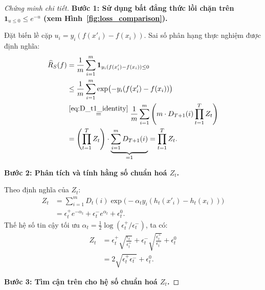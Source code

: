 \begin{proof}[Chứng minh chi tiết]
\textbf{Bước 1: Sử dụng bất đẳng thức lồi chặn trên $\mathbf{1}_{u \leq 0} \leq e^{-u}$ (xem Hình~\ref{fig:loss_comparison}).}

Đặt biến lề cặp $u_i = y_i(f(x'_i) - f(x_i))$. Sai số phân hạng thực nghiệm được định nghĩa:
\begin{align*}
    \widehat{R}_S(f) &= \frac{1}{m} \sum_{i=1}^m \mathbf{1}_{y_i(f(x'_i) - f(x_i)) \leq 0} \\
    &\leq \frac{1}{m} \sum_{i=1}^m \exp\bigl(-y_i(f(x'_i) - f(x_i))\bigr) \\
    &\stackrel{\eqref{eq:D_t1_identity}}{=} \frac{1}{m} \sum_{i=1}^m \left( m \cdot D_{T+1}(i) \prod_{t=1}^T Z_t \right) \\
    &= \left( \prod_{t=1}^T Z_t \right) \cdot \underbrace{\sum_{i=1}^m D_{T+1}(i)}_{=1} = \prod_{t=1}^T Z_t.
\end{align*}

\textbf{Bước 2: Phân tích và tính hằng số chuẩn hoá $Z_t$.}

Theo định nghĩa của $Z_t$:
\begin{align*}
    Z_t &= \sum_{i=1}^m D_t(i) \exp\bigl(-\alpha_t y_i(h_t(x'_i) - h_t(x_i))\bigr) \\
    &= \epsilon^+_t e^{-\alpha_t} + \epsilon^-_t e^{\alpha_t} + \epsilon^0_t.
\end{align*}
Thế hệ số tin cậy tối ưu $\alpha_t = \frac{1}{2}\log(\epsilon^+_t/\epsilon^-_t)$, ta có:
\begin{align*}
    Z_t &= \epsilon^+_t \sqrt{\frac{\epsilon^-_t}{\epsilon^+_t}} + \epsilon^-_t \sqrt{\frac{\epsilon^+_t}{\epsilon^-_t}} + \epsilon^0_t \\
    &= 2\sqrt{\epsilon^+_t \epsilon^-_t} + \epsilon^0_t.
\end{align*}

\textbf{Bước 3: Tìm cận trên cho hệ số chuẩn hoá $Z_t$.}


\end{proof}
